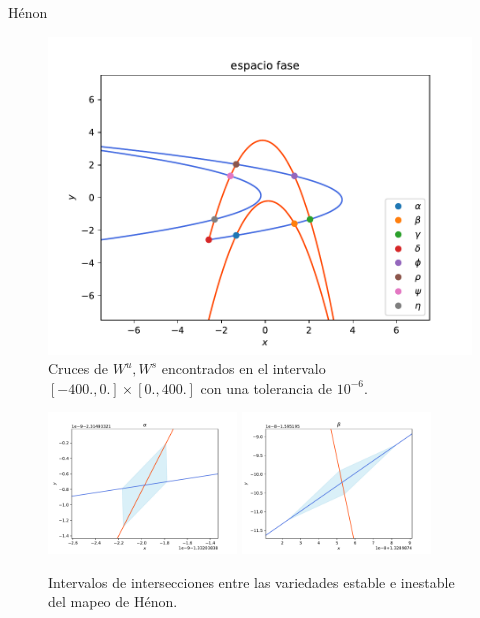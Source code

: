 \documentclass[11pt]{beamer}
\theoremstyle{definition}
\begin{document}
\begin{frame}{H\'enon}
\begin{figure}
	\centering
	\includegraphics[scale=0.5]{crucesL}
	\caption{Cruces de $W^{u},W^{s}$ encontrados en el intervalo $[-400.,0.] \times [0.,400.]$ con una tolerancia de $10^{-6}$.}
	\label{crucesH}
\end{figure}
\end{frame}

\begin{frame}
\begin{figure}
	\includegraphics[width=50mm]{alpha}
	\includegraphics[width=50mm]{beta}
	\caption{Intervalos de intersecciones entre las variedades estable e inestable del mapeo de Hénon.} 
	\label{matriz_cortes}
\end{figure}
\end{frame}
\end{document}
